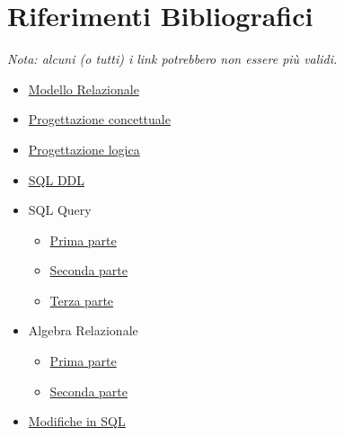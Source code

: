 \documentclass[12pt, a4paper]{report}
\begin{document}
    \chapter{Riferimenti Bibliografici}
    \textit{Nota: alcuni (o tutti) i link potrebbero non essere più validi.}
    \begin{itemize}
        \item \href{https://www.dropbox.com/scl/fi/9w8y5cb2peg4oz7kvr05v/modelloRelazionale.pdf?rlkey=b8f9fo2e8tms0la9wqlkf5pno&e=1&dl=0}{Modello Relazionale}
        \item \href{https://www.dropbox.com/scl/fi/ptunok2aixlle4zso58va/concettuale.pdf?rlkey=e0pvma78pnq2vdkisp81tcsux&e=1&dl=0}{Progettazione concettuale}
        \item \href{https://www.dropbox.com/scl/fi/jjvvpol4p4vodi24jjr1u/progettazionelogica.pdf?rlkey=ggi2mchpt7xrnumhvprdi420x&e=1&dl=0}{Progettazione logica}
        \item \href{https://www.dropbox.com/scl/fi/wjtpva027ju0fei216kls/sqlDDL.pdf?rlkey=5a0k6g99sq8zvx4iea4df6c5l&e=1&dl=0}{SQL DDL}
        \item SQL Query \begin{itemize}
            \item \href{https://www.dropbox.com/scl/fi/ly22527v36sp153e38c1g/sqlQuery1.pdf?rlkey=08pme9f9kornu6m0utbvejeyl&e=1&dl=0}{Prima parte}
            \item \href{https://www.dropbox.com/scl/fi/eczn4be6s050tzxrtqbym/sqlQuery2.pdf?rlkey=pf45n3a0da1m32ub8yquflb5v&e=1&dl=0}{Seconda parte}
            \item \href{https://www.dropbox.com/scl/fi/q6gl4sn3egmqeejs5z74l/sqlQuery3.pdf?rlkey=yg82xztwpktkhrg0u59i5jm8d&e=1&dl=0}{Terza parte}
        \end{itemize}
        \item Algebra Relazionale \begin{itemize}
            \item \href{https://www.dropbox.com/scl/fi/c1grvxcutg64g3ud33925/algebraRelazionale1.pdf?rlkey=uhzbmw6t125hw6khkd0uhv4uh&e=1&dl=0}{Prima parte}
            \item \href{https://www.dropbox.com/scl/fi/g8c7xiqw56bs1pbcepcx3/algebraRelazionale2.pdf?rlkey=i9pznnyv1vzkeyje7ujjiy3cg&e=1&dl=0}{Seconda parte}
        \end{itemize}
        \item \href{https://2023.aulaweb.unige.it/pluginfile.php/352551/mod_book/chapter/829/sqlModifiche.pdf}{Modifiche in SQL}

\end{itemize}
\end{document}
